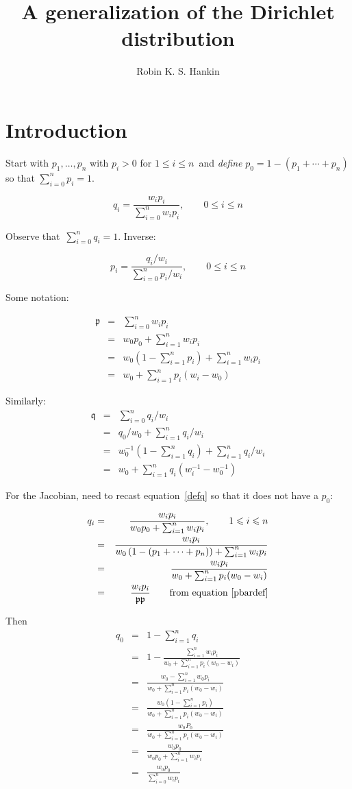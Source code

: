 \documentclass[nojss]{jss}
\author{Robin K. S. Hankin}
\title{A generalization of the Dirichlet distribution}
\newcommand{\ztn}{\ensuremath{0\leqslant i\leqslant n}}
\newcommand{\otn}{\ensuremath{1\leqslant i\leqslant n}}
\newcommand{\sztn}{\sum_{i=0}^{n}}
\newcommand{\sotn}{\sum_{i=1}^{n}}
\begin{document}
\section{Introduction}

Start with $p_1,\ldots,p_n$ with $p_i>0$ for \otn\ and {\em define}
$p_0=1-\left(p_1+\cdots+p_n\right)$ so that $\sztn p_i=1$.

\begin{equation}\label{defq}
q_i = \frac{w_ip_i}{\sum_{i=0}^n w_ip_i},\qquad\ztn
\end{equation}

Observe that~$\sztn q_i=1$.  Inverse:

\begin{equation}\label{defp}
  p_i= \frac{q_i/w_i}{\sum_{i=0}^n p_i/w_i},\qquad\ztn
\end{equation}

Some notation:

\begin{align}
  \mathfrak{p} &=& \sztn w_ip_i\\
  &=& w_0p_0 + \sotn w_ip_i\\
  &=& w_0\left(1-\sotn p_i\right) + \sotn w_ip_i\\
  &=& w_0 +\sotn p_i(w_i-w_0)\label{pbardef}
\end{align}

Similarly:
\begin{align}
{\mathfrak q} &=& \sztn q_i/w_i\\
  &=& q_0/w_0 + \sotn q_i/w_i\\
  &=& w_0^{-1}(1-\sotn q_i) + \sotn q_i/w_i\\
  &=& w_0 +\sotn q_i\left(w_i^{-1}-w_0^{-1}\right)
\end{align}
  
For the Jacobian, need to recast equation~\ref{defq} so that it does
not have a $p_0$:

\begin{align}
q_i &=& \frac{w_ip_i}{w_0p_0+\sotn w_ip_i},\qquad\otn\\
    &=& \frac{w_ip_i}{w_0\left(1-(p_1+\cdots+p_n)\right)+\sotn w_ip_i}\\
    &=& \frac{w_ip_i}{w_0 + \sotn p_i(w_0-w_i)}\\
    &=& \frac{w_ip_i}{\mathfrak{p}{\mathfrak p}}\label{asdf}\qquad\mbox{from equation~\ref{pbardef}}
\end{align}


Then
\begin{align}
  q_0 &=& 1-\sotn q_i \\ 
      &=& 1-\frac{\sotn{w_ip_i}}{w_0 + \sotn p_i(w_0-w_i)}\\
      &=& \frac{w_0 -\sotn{w_0p_i}}{w_0 + \sotn p_i(w_0-w_i)}\\
      &=& \frac{w_0(1-\sotn{p_i})}{w_0 + \sotn p_i(w_0-w_i)}\\
      &=& \frac{w_0P_0}{w_0 + \sotn p_i(w_0-w_i)}\\
      &=& \frac{w_0p_0}{w_0p_0 + \sotn w_ip_i}\\
      &=& \frac{w_0p_0}{\sztn w_ip_i}
\end{align}
\end{document}
